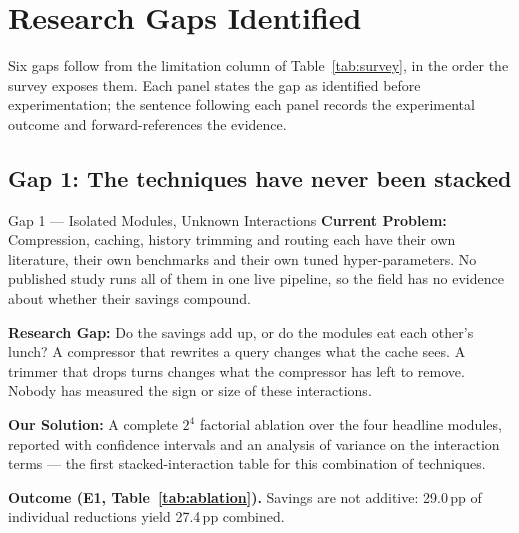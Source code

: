 \documentclass[11pt,a4paper]{article}
\newcommand{\lbl}[1]{\textcolor{accent}{\textbf{#1}}}
\begin{document}
\section{Research Gaps Identified}
\label{sec:gaps}

Six gaps follow from the limitation column of Table~\ref{tab:survey}, in the
order the survey exposes them. Each panel states the gap as identified before
experimentation; the sentence following each panel records the experimental
outcome and forward-references the evidence.

\subsection{Gap 1: The techniques have never been stacked}
\begin{gap}{Gap 1 --- Isolated Modules, Unknown Interactions}
\lbl{Current Problem:} Compression, caching, history trimming and routing each
have their own literature, their own benchmarks and their own tuned
hyper-parameters. No published study runs all of them in one live pipeline, so
the field has no evidence about whether their savings compound.

\lbl{Research Gap:} Do the savings add up, or do the modules eat each other's
lunch? A compressor that rewrites a query changes what the cache sees. A trimmer
that drops turns changes what the compressor has left to remove. Nobody has
measured the sign or size of these interactions.

\lbl{Our Solution:} A complete $2^4$ factorial ablation over the four headline
modules, reported with confidence intervals and an analysis of variance on the
interaction terms --- the first stacked-interaction table for this combination of
techniques.
\end{gap}
\noindent\textbf{Outcome (E1, Table~\ref{tab:ablation}).} Savings are not
additive: 29.0\,pp of individual reductions yield 27.4\,pp combined.
\end{document}
